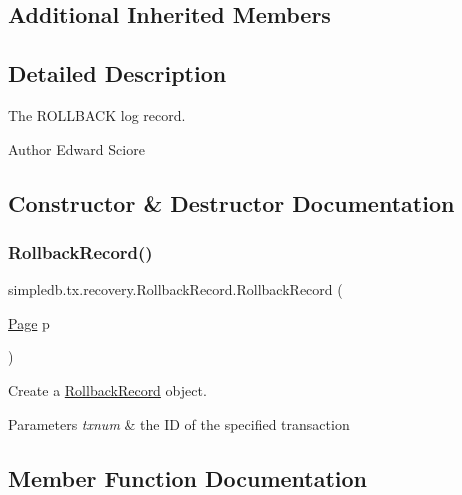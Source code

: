 \subsection*{Additional Inherited Members}


\subsection{Detailed Description}
The R\+O\+L\+L\+B\+A\+CK log record. \begin{DoxyAuthor}{Author}
Edward Sciore 
\end{DoxyAuthor}


\subsection{Constructor \& Destructor Documentation}
\mbox{\label{classsimpledb_1_1tx_1_1recovery_1_1RollbackRecord_a0e7540ad9c5f594ccfce3a1e0f38d72c}} 
\subsubsection{\texorpdfstring{Rollback\+Record()}{RollbackRecord()}}
{\footnotesize\ttfamily simpledb.\+tx.\+recovery.\+Rollback\+Record.\+Rollback\+Record (\begin{DoxyParamCaption}\item[{\hyperlink{classsimpledb_1_1file_1_1Page}{Page}}]{p }\end{DoxyParamCaption})\hspace{0.3cm}{\ttfamily [inline]}}

Create a \hyperlink{classsimpledb_1_1tx_1_1recovery_1_1RollbackRecord}{Rollback\+Record} object. 
\begin{DoxyParams}{Parameters}
{\em txnum} & the ID of the specified transaction \\
\hline
\end{DoxyParams}


\subsection{Member Function Documentation}
\mbox{\label{classsimpledb_1_1tx_1_1recovery_1_1RollbackRecord_a4131d5dbb07f84058bd9551d023ff34b}} 
